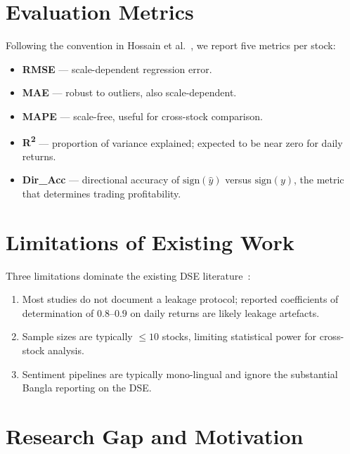 \documentclass[12pt,a4paper,oneside]{report}
\begin{document}
\section{Evaluation Metrics}

Following the convention in Hossain et al.~\cite{hossain2019dse},
we report five metrics per stock:

\begin{itemize}[leftmargin=*,itemsep=2pt]
  \item \textbf{\ac{RMSE}} --- scale-dependent regression error.
  \item \textbf{\ac{MAE}} --- robust to outliers, also
        scale-dependent.
  \item \textbf{\ac{MAPE}} --- scale-free, useful for cross-stock
        comparison.
  \item \textbf{\texorpdfstring{R\textsuperscript{2}}{R²}} ---
        proportion of variance explained; expected to be near zero
        for daily returns.
  \item \textbf{Dir\_Acc} --- directional accuracy of
        $\mathrm{sign}(\hat y)$ versus $\mathrm{sign}(y)$, the
        metric that determines trading profitability.
\end{itemize}

\section{Limitations of Existing Work}

Three limitations dominate the existing DSE
literature~\cite{sezer2020financial,goodfellow2016deep}:

\begin{enumerate}[leftmargin=*,itemsep=2pt]
  \item Most studies do not document a leakage protocol; reported
        coefficients of determination of $0.8$--$0.9$ on daily
        returns are likely leakage artefacts.
  \item Sample sizes are typically $\leq 10$ stocks, limiting
        statistical power for cross-stock analysis.
  \item Sentiment pipelines are typically mono-lingual and ignore
        the substantial Bangla reporting on the DSE.
\end{enumerate}

\section{Research Gap and Motivation}
\end{document}
